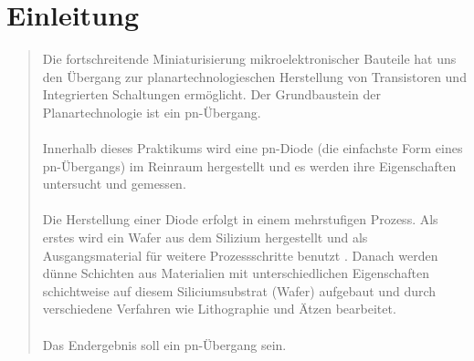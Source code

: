 \newcommand{\institut}{}
\newcommand{\fachgebiet}{Halbleiterbauelemente}
\newcommand{\veranstaltung}{Praktikum Technologie und Bauelemente der Halbleitertechnik}
\newcommand{\pdfautor}{Dirk Barbendererde (321 836), Thomas Kapa (325319), Alona Siebert (), Özgü Dogan (326 048)}
\newcommand{\autor}{Dirk Barbendererde (321 836)\\ Thomas Kapa (325319)\\ Alona Siebert ()\\ \"Ozg\"u Dogan (326 048)}
\newcommand{\pdftitle}{Praktikum\ Technologie und Bauelemente der
Halbleitertechnik}
\newcommand{\prototitle}{Praktikum Technologie und Bauelemente der Halbleitertechnik}
\newcommand{\aufgabe}{}

\newcommand{\gruppe}{Gruppe 1}
\newcommand{\betreuer}{Betreuer:\\ Clemens Helfmeier\\ Philipp Scholz}





\setcaptionwidth{7.5cm}




% 

\sloppy




\section{Einleitung}
\begin{quote}


	Die fortschreitende Miniaturisierung mikroelektronischer Bauteile hat uns
	den Übergang zur planartechnologieschen Herstellung  von Transistoren und
	Integrierten Schaltungen ermöglicht. Der Grundbaustein der Planartechnologie
	ist ein pn-Übergang.\\
	\\
	Innerhalb dieses Praktikums wird eine pn-Diode (die einfachste Form eines
	pn-Übergangs) im Reinraum hergestellt und es werden ihre Eigenschaften
	untersucht und gemessen.\\
	\\
	Die Herstellung einer Diode erfolgt in einem mehrstufigen Prozess.
 	Als erstes wird ein Wafer aus dem Silizium hergestellt und als
 	Ausgangsmaterial für weitere Prozessschritte benutzt . Danach werden dünne
 	Schichten aus Materialien mit unterschiedlichen Eigenschaften schichtweise
 	auf diesem Siliciumsubstrat (Wafer) aufgebaut und durch verschiedene
 	Verfahren wie Lithographie und Ätzen bearbeitet.\\
 	\\
 	Das Endergebnis soll ein pn-Übergang sein.\\

\end{quote} %

